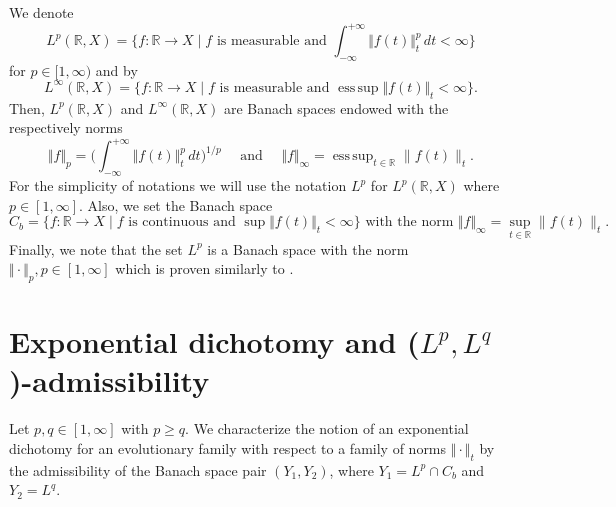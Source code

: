 \documentclass[reqno]{amsart}
\newtheorem{theorem}{Theorem}[section]
\DeclareMathOperator*{\esssup}{ess\,sup}
\def\r{\mathbb{R}}
\begin{document}
We denote
$$ 
L^p(\r,X)=\{f:\r \to X \mid f \text{ is measurable and } \int_{-\infty}^{+\infty}\Vert f(t)\Vert_t^p \,dt < \infty\}
$$
for $p\in [1, \infty)$  and by
$$ 
L^\infty(\r,X)=\{f:\r \to X \mid f \text{ is measurable and } \esssup \Vert f(t)\Vert_t < \infty\}.
$$
Then, $L^p(\r,X)$ and $L^\infty (\r,X)$ are Banach spaces endowed with the respectively norms
 $$\Vert f\Vert_p= \Big( \int_{-\infty}^{+\infty}\Vert f(t)\Vert_t^p \,dt\Big)^{1/p} \quad
\text{ and } \quad  \Vert f\Vert_\infty = \esssup_{t\in \r} \|f(t)\|_t.
$$
For the simplicity of notations we will use the notation $L^p$ for $L^p(\r,X)$ where $p\in [1,\infty]$. Also, we set the Banach space
$$ C_b= \{f:\r \to X \mid f \text{ is continuous and } \sup \Vert f(t)\Vert_t < \infty\} \text{ with the norm }  \Vert f\Vert_\infty = \sup_{t\in \r} \|f(t)\|_t.$$
Finally, we note that the set $L^p$ is a Banach space with the norm $\Vert \cdot\Vert _p, p\in [1,\infty]$ which is proven similarly to \cite[Theorem 1]{14}.

 \section{Exponential dichotomy and ($L^p,L^q$)-admissibility}
 Let $p,q \in [1, \infty]$ with $p \geq q$. We characterize the notion of an exponential dichotomy for an evolutionary family with respect to a family of norms $\Vert \cdot\Vert _t$ by the admissibility of the Banach space pair $(Y_1,Y_2)$, where $Y_1=L^p\cap C_b$ and $Y_2=L^q$.
\end{document}
